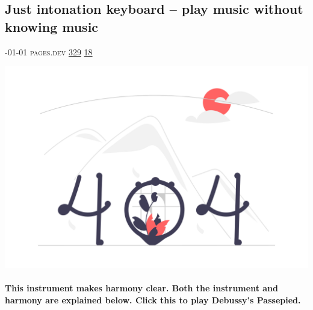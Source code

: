 \documentclass[10pt,a4paper]{article}
\begin{document}
\begin{multicols*}{2}
\begin{minipage}{\linewidth}
\subsection{Just intonation keyboard – play music without knowing music}
\textsc{\footnotesize
{\scriptsize\faCalendar}-01-01 
{\scriptsize\faGlobe}\space 
pages.dev 
{\scriptsize\faThumbsOUp}\space 
\href{http://news.ycombinator.com/item?id=37194128\&utm\_term=comment}{329} 
{\scriptsize\faComments}\space 
\href{http://news.ycombinator.com/item?id=37194128\&utm\_term=comment}{18} 
}
\par\medskip\noindent
\href{https://ad8e.pages.dev/keyboard?utm\_source=hackernewsletter\&utm\_medium=email\&utm\_term=show\_hn}{
    \includegraphics[width=0.99\linewidth]{notfound.png}
}
\end{minipage}
\paragraph{}
\textbf{This instrument makes harmony clear. Both the instrument and harmony are explained below.
Click this to play Debussy's Passepied.}
\paragraph{}


\end{multicols*}
\end{document}
